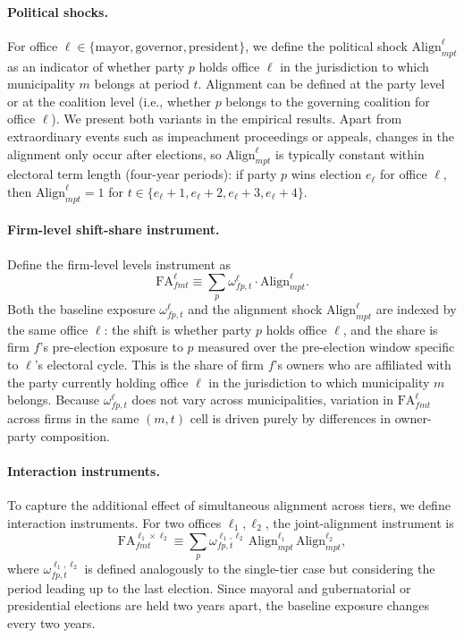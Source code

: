 \documentclass{article}
\newcommand{\Align}{\mathrm{Align}}
\newcommand{\FA}{\mathrm{FA}}
\begin{document}
\paragraph{Political shocks.}
For office $\ell\in\{\mathrm{mayor},\mathrm{governor},\mathrm{president}\}$, we define the political shock $\Align^{\ell}_{mpt}$ as an indicator of whether party $p$ holds office $\ell$ in the jurisdiction to which municipality $m$ belongs at period $t$. Alignment can be defined at the party level or at the coalition level (i.e., whether $p$ belongs to the governing coalition for office $\ell$). We present both variants in the empirical results. Apart from extraordinary events such as impeachment proceedings or appeals, changes in the alignment only occur after elections, so $\Align^{\ell}_{mpt}$ is typically constant within electoral term length (four-year periods): if party $p$ wins election $e_\ell$ for office $\ell$, then $\Align^{\ell}_{mpt} = 1$ for $t \in \{e_\ell+1, e_\ell + 2, e_\ell + 3, e_\ell + 4\}$.

\paragraph{Firm-level shift-share instrument.}
Define the firm-level levels instrument as
\[
  \FA^{\ell}_{fmt} \equiv \sum_{p} \omega^\ell_{fp,t} \cdot \Align^{\ell}_{mpt}.
\]
Both the baseline exposure $\omega^\ell_{fp,t}$ and the alignment shock $\Align^{\ell}_{mpt}$ are indexed by the same office $\ell$: the shift is whether party $p$ holds office $\ell$, and the share is firm $f$'s pre-election exposure to $p$ measured over the pre-election window specific to $\ell$'s electoral cycle. This is the share of firm $f$'s owners who are affiliated with the party currently
holding office $\ell$ in the jurisdiction to which municipality $m$ belongs.
Because $\omega^\ell_{fp,t}$ does not vary across municipalities,
variation in $\FA^{\ell}_{fmt}$ across firms in the same $(m,t)$ cell
is driven purely by differences in owner-party composition.

\paragraph{Interaction instruments.}
To capture the additional effect of simultaneous alignment across tiers,
we define interaction instruments.
For two offices $\ell_1, \ell_2$, the joint-alignment instrument is
\[
  \FA^{\ell_1 \times \ell_2}_{fmt} \equiv
  \sum_p \omega^{\ell_1,\ell_2}_{fp,t}\,\Align^{\ell_1}_{mpt}\,\Align^{\ell_2}_{mpt},
\]
where $\omega^{\ell_1,\ell_2}_{fp,t}$ is defined analogously to the single-tier case but considering the period leading up to the last election. Since mayoral and gubernatorial or presidential elections are held two years apart, the baseline exposure changes every two years.
\end{document}

